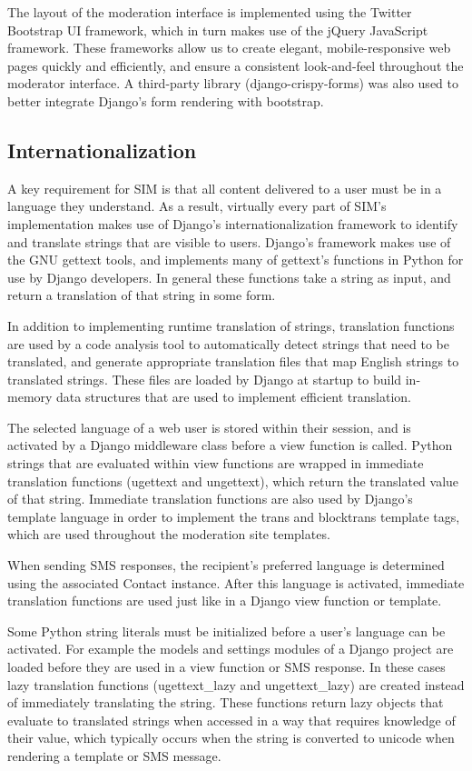 \documentclass{acm_proc_article-sp}
\begin{document}
The layout of the moderation interface is implemented using the Twitter Bootstrap UI framework, which in turn makes use of the jQuery JavaScript framework. These frameworks allow us to create elegant, mobile-responsive web pages quickly and efficiently, and ensure a consistent look-and-feel throughout the moderator interface. A third-party library (django-crispy-forms) was also used to better integrate Django's form rendering with bootstrap.

\subsection{Internationalization}

A key requirement for SIM is that all content delivered to a user must be in a language they understand. As a result, virtually every part of SIM's implementation makes use of Django's internationalization framework to identify and translate strings that are visible to users. Django's framework makes use of the GNU gettext tools, and implements many of gettext's functions in Python for use by Django developers. In general these functions take a string as input, and return a translation of that string in some form.

In addition to implementing runtime translation of strings, translation functions are used by a code analysis tool to automatically detect strings that need to be translated, and generate appropriate translation files that map English strings to translated strings. These files are loaded by Django at startup to build in-memory data structures that are used to implement efficient translation.

The selected language of a web user is stored within their session, and is activated by a Django middleware class before a view function is called. Python strings that are evaluated within view functions are wrapped in immediate translation functions (ugettext and ungettext), which return the translated value of that string. Immediate translation functions are also used by Django's template language in order to implement the trans and blocktrans template tags, which are used throughout the moderation site templates.

When sending SMS responses, the recipient's preferred language is determined using the associated Contact instance. After this language is activated, immediate translation functions are used just like in a Django view function or template.

Some Python string literals must be initialized before a user's language can be activated. For example the models and settings modules of a Django project are loaded before they are used in a view function or SMS response. In these cases lazy translation functions (ugettext\_lazy and ungettext\_lazy) are created instead of immediately translating the string. These functions return lazy objects that evaluate to translated strings when accessed in a way that requires knowledge of their value, which typically occurs when the string is converted to unicode when rendering a template or SMS message.
\end{document}
